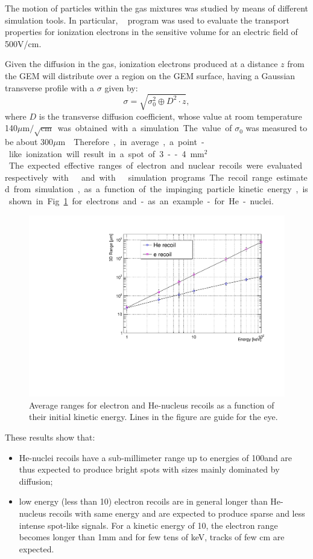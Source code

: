 \documentclass[12pt]{iopart}
\begin{document}
The motion of particles within the gas mixtures was studied by means
of different simulation tools. In particular,
\garfield~\cite{bib:garfield,bib:garfield1} program was used to
evaluate the transport properties for ionization electrons in the
sensitive volume for an electric field of 500\unit{V/cm}.

Given the diffusion in the gas, ionization electrons produced at a
distance $z$ from the GEM will distribute over a region on the GEM
surface, having a Gaussian transverse profile with a $\sigma$ given
by:
%
\begin{equation}
\label{eq:diff}
\sigma = \sqrt{\sigma^2_0 \oplus D^2 \cdot z},
\end{equation}
where $D$ is the transverse diffusion coefficient, whose value at room
temperature 140\unit{$\mu{\mathrm{m}}/\sqrt{\mathrm{cm}}$} was
obtained with a simulation.  The value of $\sigma_0$ was measured to
be about 300\unit{$\mu$m} \cite{bib:btf,bib:fe55New}. Therefore, in
average, a point-like ionization will result in a spot of
3--4\unit{mm$^2$}.

The expected effective ranges of electron and nuclear recoils were
evaluated respectively with \GEANTfour~\cite{GEANT4} and with
\SRIM~\cite{bib:srim} simulation programs. The recoil range estimated
from simulation, as a function of the impinging particle kinetic
energy, is shown in Fig.~\ref{fig:range} for electrons and -as an
example- for He-nuclei.
%
\begin{figure}[ht]
  \begin{center}
    \includegraphics[width=0.49\linewidth]{figures/range_ER_NR.pdf}
    \caption{Average ranges for electron and He-nucleus recoils as a
      function of their initial kinetic energy. Lines in the figure are guide for the eye.
      \label{fig:range}}
      \end{center}
\end{figure}
%
These results show that:
\begin{itemize}
    \item He-nuclei recoils have a sub-millimeter range up to energies
      of 100\keV and are thus expected to produce bright spots with
      sizes mainly dominated by diffusion;
    \item low energy (less than 10\keV) electron recoils are in
      general longer than He-nucleus recoils with same energy and are
      expected to produce sparse and less intense spot-like signals. For a
      kinetic energy of 10\keV, the electron range becomes longer than
      1\unit{mm} and for few tens of keV, tracks of few cm are
      expected.
\end{itemize}
\end{document}
